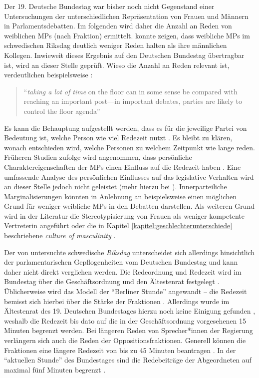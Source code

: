 \documentclass[12pt, 
    twoside=false, 
    bibliography=totoc, 
    numbers=endperiod, 
    headings=normal, 
    toc=chapterentrydotfill
    ]{scrbook}
\begin{document}
Der 19. Deutsche Bundestag war bisher noch nicht Gegenstand einer Untersuchungen der unterschiedlichen Repräsentation von Frauen und Männern in Parlamentsdebatten. Im folgenden wird daher die Anzahl an Reden von weiblichen MPs (nach Fraktion) ermittelt. \textcite{back_2014} konnte zeigen, dass weibliche MPs im schwedischen Riksdag deutlich weniger Reden halten als ihre männlichen Kollegen. Inwieweit dieses Ergebnis auf den Deutschen Bundestag übertragbar ist, wird an dieser Stelle geprüft. Wieso die Anzahl an Reden relevant ist, verdeutlichen beispielsweise \textcite{back_2014}:

\citereset
\begin{quote}
     \enquote{\emph{taking a lot of time} on the floor can in some sense be compared with reaching an important post—in important debates, parties are likely to control the floor agenda} \parencites[507]{back_2014}
\end{quote}

Es kann die Behauptung aufgestellt werden, dass es für die jeweilige Partei von Bedeutung ist, welche Person wie viel Redezeit nutzt \parencite[vgl.][]{proksch_2012}. Es bleibt zu klären, wonach entschieden wird, welche Personen zu welchem Zeitpunkt wie lange reden.
%
Früheren Studien zufolge wird angenommen, dass persönliche Charaktereigenschaften der MPs einen Einfluss auf die Redezeit haben \parencite[505]{back_2014}. Eine umfassende Analyse des persönlichen Einflusses auf das legislative Verhalten wird an dieser Stelle jedoch nicht geleistet (mehr hierzu bei \textcite{saalfeld_2011}). Innerparteiliche Marginalisierungen könnten in Anlehnung an \textcite[507]{back_2014} beispielsweise einen möglichen Grund für weniger weibliche MPs in den Debatten darstellen. Als weiteren Grund wird in der Literatur die Stereotypisierung von Frauen als weniger kompetente Vertreterin angeführt oder die in Kapitel \ref{kapitel:geschlechterunterschiede} beschriebene \emph{culture of masculinity} \parencites[507]{back_2014}{lovenduski_2005}. 

Der von \textcite{back_2014} untersuchte schwedische \emph{Riksdag} unterscheidet sich allerdings hinsichtlich der parlamentarischen Gepflogenheiten vom Deutschen Bundestag und kann daher nicht direkt verglichen werden. Die Redeordnung und Redezeit wird im Bundestag über die Geschäftsordnung und den Ältestenrat festgelegt \parencite[64f.]{linn_2018}. Üblicherweise wird das Modell der \enquote{Berliner Stunde} angewandt -- die Redezeit bemisst sich hierbei über die Stärke der Fraktionen \parencite[vgl.][]{schreiner_2005}. Allerdings wurde im Ältestenrat des 19. Deutschen Bundestages hierzu noch keine Einigung gefunden \parencite[64]{linn_2018}, weshalb die Redezeit bis dato auf die in der Geschäftsordnung vorgesehenen 15 Minuten begrenzt werden. Bei längeren Reden von Sprecher*innen der Regierung verlängern sich auch die Reden der Oppositionsfraktionen. Generell können die Fraktionen eine längere Redezeit von bis zu 45 Minuten beantragen \parencite{bundestag_2019}. In der \enquote{aktuellen Stunde} des Bundestages sind die Redebeiträge der Abgeordneten auf maximal fünf Minuten begrenzt \parencites[68]{linn_2018}[]{bundestag_2019}.
\end{document}
